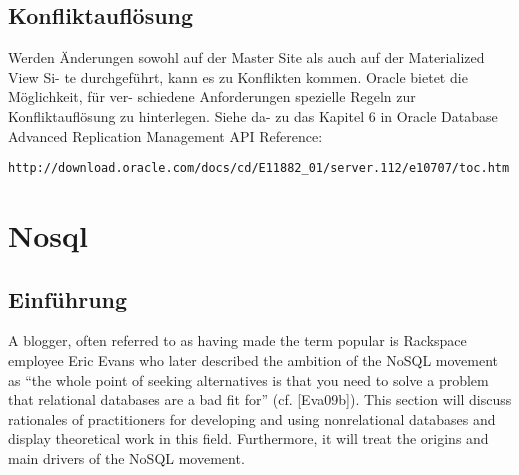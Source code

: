 \documentclass[a4paper,10pt,titlepage=false]{scrreprt}
\begin{document}
\begin{itemize}
\section{Konfliktauflösung} %
\label{sec:konfliktaufl_sung}
Werden Änderungen sowohl auf der Master Site als auch auf der Materialized View Si-
te durchgeführt, kann es zu Konflikten kommen. Oracle bietet die Möglichkeit, für ver-
schiedene Anforderungen spezielle Regeln zur Konfliktauflösung zu hinterlegen. Siehe da-
zu das Kapitel 6 in Oracle Database Advanced Replication Management API Reference:
\begin{verbatim}
http://download.oracle.com/docs/cd/E11882_01/server.112/e10707/toc.htm
\end{verbatim}

\chapter{Nosql}

\section{Einführung} %
\label{sec:einf_hrung}
A blogger, often referred to as having made the term popular is Rackspace employee Eric Evans who later
described the ambition of the NoSQL movement as “the whole point of seeking alternatives is that you
need to solve a problem that relational databases are a bad fit for” (cf. [Eva09b]).
This section will discuss rationales of practitioners for developing and using nonrelational databases and
display theoretical work in this field. Furthermore, it will treat the origins and main drivers of the NoSQL
movement.


\end{itemize}
\end{document}

